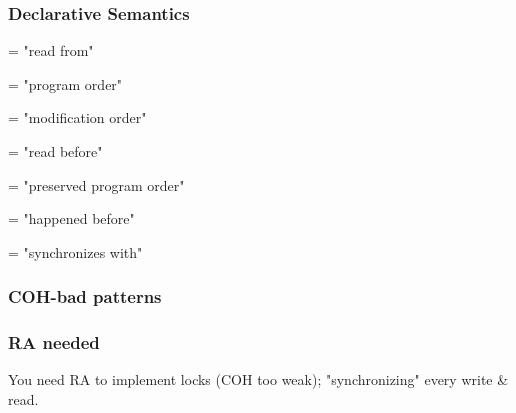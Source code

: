 \subsubsection*{Declarative Semantics}


\hSep

 = "read from" 

 = "program order" 

 = "modification order" 

 = "read before" 

 = "preserved program order" 

 = "happened before" 

 = "synchronizes with" 

\hSep

\subsubsection*{COH-bad patterns}


\hSep

\subsubsection*{RA needed}


You need RA to implement locks (COH too weak); "synchronizing" every write \& read.

\hSep